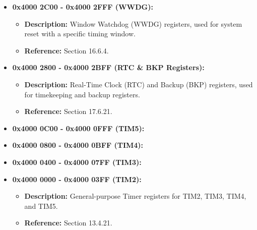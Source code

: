 \documentclass{article}
\begin{document}
\begin{itemize}
\begin{itemize}
        \item \textbf{0x4000 2C00 - 0x4000 2FFF (WWDG):}
        \begin{itemize}
            \item \textbf{Description:} Window Watchdog (WWDG) registers, used for system reset with a specific timing window.
            \item \textbf{Reference:} Section 16.6.4.
        \end{itemize}
        
        \item \textbf{0x4000 2800 - 0x4000 2BFF (RTC \& BKP Registers):}
        \begin{itemize}
            \item \textbf{Description:} Real-Time Clock (RTC) and Backup (BKP) registers, used for timekeeping and backup registers.
            \item \textbf{Reference:} Section 17.6.21.
        \end{itemize}
        
        \item \textbf{0x4000 0C00 - 0x4000 0FFF (TIM5):}
        \item \textbf{0x4000 0800 - 0x4000 0BFF (TIM4):}
        \item \textbf{0x4000 0400 - 0x4000 07FF (TIM3):}
        \item \textbf{0x4000 0000 - 0x4000 03FF (TIM2):}
        \begin{itemize}
            \item \textbf{Description:} General-purpose Timer registers for TIM2, TIM3, TIM4, and TIM5.
            \item \textbf{Reference:} Section 13.4.21.
        \end{itemize}
    \end{itemize}
\end{itemize}
\end{document}
